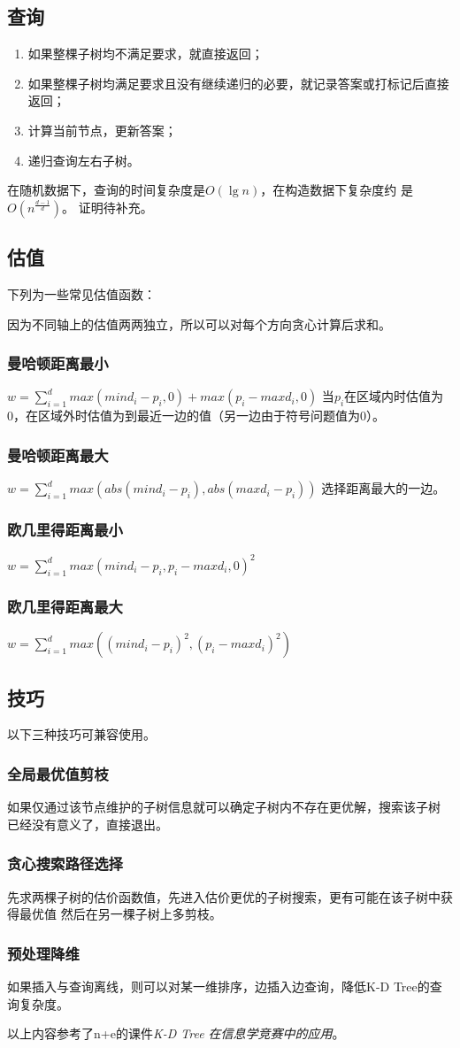 \subsection{查询}
\begin{enumerate}
	\item 如果整棵子树均不满足要求，就直接返回；
	\item 如果整棵子树均满足要求且没有继续递归的必要，就记录答案或打标记后直接返回；
	\item 计算当前节点，更新答案；
	\item 递归查询左右子树。
\end{enumerate}
在随机数据下，查询的时间复杂度是$O(\lg n)$，在构造数据下复杂度约
是$O(n^\frac{d-1}{d})$。
证明待补充。
\subsection{估值}
下列为一些常见估值函数：

因为不同轴上的估值两两独立，所以可以对每个方向贪心计算后求和。
\subsubsection{曼哈顿距离最小}
$\displaystyle w=\sum_{i=1}^d{max(mind_i-p_i,0)+max(p_i-maxd_i,0)}$
当$p_i$在区域内时估值为0，在区域外时估值为到最近一边的值（另一边由于符号问题值为0）。
\subsubsection{曼哈顿距离最大}
$\displaystyle w=\sum_{i=1}^d{max(abs(mind_i-p_i),abs(maxd_i-p_i))}$
选择距离最大的一边。
\subsubsection{欧几里得距离最小}
$\displaystyle w=\sum_{i=1}^d{max(mind_i-p_i,p_i-maxd_i,0)^2}$
\subsubsection{欧几里得距离最大}
$\displaystyle w=\sum_{i=1}^d{max((mind_i-p_i)^2,(p_i-maxd_i)^2)}$
\subsection{技巧}
以下三种技巧可兼容使用。
\subsubsection{全局最优值剪枝}
如果仅通过该节点维护的子树信息就可以确定子树内不存在更优解，搜索该子树
已经没有意义了，直接退出。
\subsubsection{贪心搜索路径选择}
先求两棵子树的估价函数值，先进入估价更优的子树搜索，更有可能在该子树中获得最优值
然后在另一棵子树上多剪枝。
\subsubsection{预处理降维}
如果插入与查询离线，则可以对某一维排序，边插入边查询，降低K-D Tree的查询复杂度。

以上内容参考了n+e的课件\emph{K-D Tree 在信息学竞赛中的应用}\cite{kdTree}。
